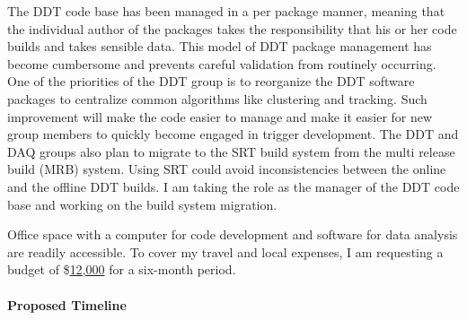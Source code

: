 \documentclass[a4paper, 11pt]{article} %
\begin{document}
The DDT code base has been managed in a per package manner, meaning that the individual author of the packages takes the responsibility that his or her code builds and takes sensible data. This model of DDT package management has become cumbersome and prevents careful validation from routinely occurring. One of the priorities of the DDT group is to reorganize the DDT software packages to centralize common algorithms like clustering and tracking. Such improvement will make the code easier to manage and make it easier for new group members to quickly become engaged in trigger development. The DDT and DAQ groups also plan to migrate to the SRT build system from the multi release build (MRB) system. Using SRT could avoid inconsistencies between the online and the offline DDT builds. I am taking the role as the manager of the DDT code base and working on the build system migration.\newline

Office space with a computer for code development and software for data analysis are readily accessible. To cover my travel and local expenses, I am requesting a budget of \$\underline{12,000} for a six-month period.
\clearpage

\paragraph{\textbf{Proposed Timeline}}\hspace*{\fill}\\
\end{document}
